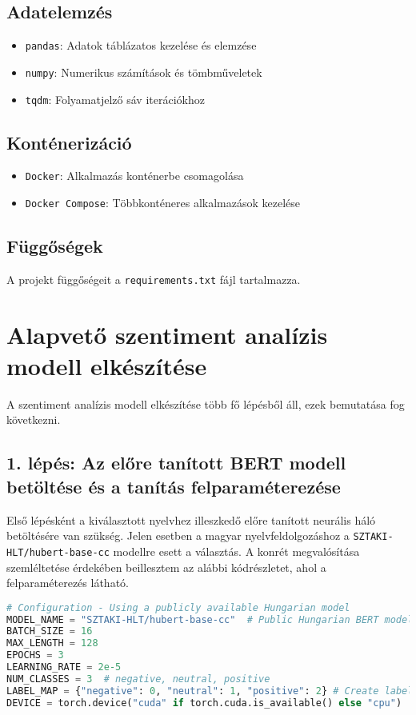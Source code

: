 \documentclass[12pt]{article}
\begin{document}
\subsection{Adatelemzés}
\begin{itemize}
    \item \texttt{pandas}: Adatok táblázatos kezelése és elemzése
    \item \texttt{numpy}: Numerikus számítások és tömbműveletek
    \item \texttt{tqdm}: Folyamatjelző sáv iterációkhoz
\end{itemize}

\subsection{Konténerizáció}
\begin{itemize}
    \item \texttt{Docker}: Alkalmazás konténerbe csomagolása
    \item \texttt{Docker Compose}: Többkonténeres alkalmazások kezelése
\end{itemize}

\subsection{Függőségek}
A projekt függőségeit a \texttt{requirements.txt} fájl tartalmazza.

\section{Alapvető szentiment analízis modell elkészítése}
A szentiment analízis modell elkészítése több fő lépésből áll, ezek bemutatása fog következni.

\subsection{1. lépés: Az előre tanított BERT modell betöltése és a tanítás felparaméterezése}
Első lépésként a kiválasztott nyelvhez illeszkedő előre tanított neurális háló betöltésére van szükség. Jelen esetben a magyar nyelvfeldolgozáshoz a \texttt{SZTAKI-HLT/hubert-base-cc} modellre esett a választás.
A konrét megvalósítása szemléltetése érdekében beillesztem az alábbi kódrészletet, ahol a felparaméterezés látható.

\begin{lstlisting}[language=Python,caption=Modell konfiguráció]
# Configuration - Using a publicly available Hungarian model
MODEL_NAME = "SZTAKI-HLT/hubert-base-cc"  # Public Hungarian BERT model
BATCH_SIZE = 16
MAX_LENGTH = 128
EPOCHS = 3
LEARNING_RATE = 2e-5
NUM_CLASSES = 3  # negative, neutral, positive
LABEL_MAP = {"negative": 0, "neutral": 1, "positive": 2} # Create label mapping
DEVICE = torch.device("cuda" if torch.cuda.is_available() else "cpu")
\end{lstlisting}
\end{document}
